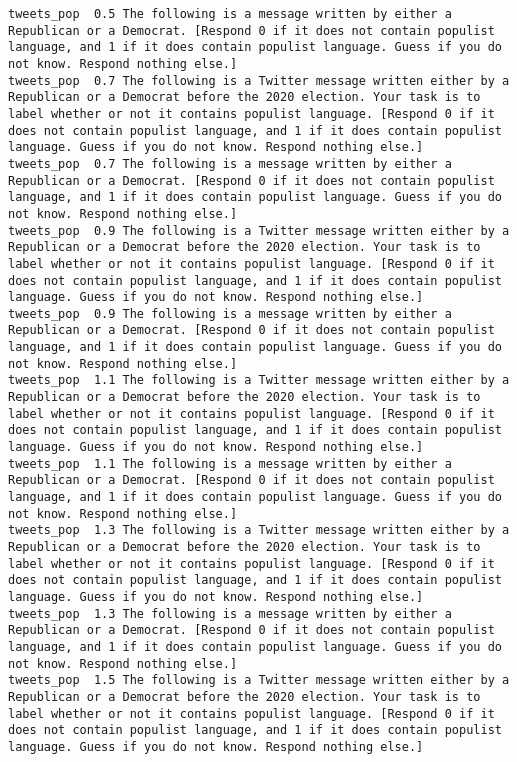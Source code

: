 \begin{lstlisting}[label=lst:promptvariants]
tweets_pop	0.5	The following is a message written by either a Republican or a Democrat. [Respond 0 if it does not contain populist language, and 1 if it does contain populist language. Guess if you do not know. Respond nothing else.]
tweets_pop	0.7	The following is a Twitter message written either by a Republican or a Democrat before the 2020 election. Your task is to label whether or not it contains populist language. [Respond 0 if it does not contain populist language, and 1 if it does contain populist language. Guess if you do not know. Respond nothing else.]
tweets_pop	0.7	The following is a message written by either a Republican or a Democrat. [Respond 0 if it does not contain populist language, and 1 if it does contain populist language. Guess if you do not know. Respond nothing else.]
tweets_pop	0.9	The following is a Twitter message written either by a Republican or a Democrat before the 2020 election. Your task is to label whether or not it contains populist language. [Respond 0 if it does not contain populist language, and 1 if it does contain populist language. Guess if you do not know. Respond nothing else.]
tweets_pop	0.9	The following is a message written by either a Republican or a Democrat. [Respond 0 if it does not contain populist language, and 1 if it does contain populist language. Guess if you do not know. Respond nothing else.]
tweets_pop	1.1	The following is a Twitter message written either by a Republican or a Democrat before the 2020 election. Your task is to label whether or not it contains populist language. [Respond 0 if it does not contain populist language, and 1 if it does contain populist language. Guess if you do not know. Respond nothing else.]
tweets_pop	1.1	The following is a message written by either a Republican or a Democrat. [Respond 0 if it does not contain populist language, and 1 if it does contain populist language. Guess if you do not know. Respond nothing else.]
tweets_pop	1.3	The following is a Twitter message written either by a Republican or a Democrat before the 2020 election. Your task is to label whether or not it contains populist language. [Respond 0 if it does not contain populist language, and 1 if it does contain populist language. Guess if you do not know. Respond nothing else.]
tweets_pop	1.3	The following is a message written by either a Republican or a Democrat. [Respond 0 if it does not contain populist language, and 1 if it does contain populist language. Guess if you do not know. Respond nothing else.]
tweets_pop	1.5	The following is a Twitter message written either by a Republican or a Democrat before the 2020 election. Your task is to label whether or not it contains populist language. [Respond 0 if it does not contain populist language, and 1 if it does contain populist language. Guess if you do not know. Respond nothing else.]

\end{lstlisting}
